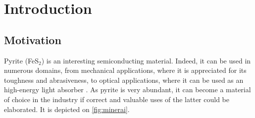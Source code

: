 \documentclass[11pt,a4paper]{article}
\makeatletter
\newcommand{\authors}{%
  \setlength\arrayrulewidth{2pt}
  \begin{tabular}{l|l}
  \@authorsi
}
\newcommand\@authorsi{\@ifnextchar\stopauthors{\@authorsend}{\@authorsii}}
\newcommand\@authorsii[2]{%
  \\
  \textbf{\Large #1} &  \textbf{\Large #2}
  \\
  \@authorsi %
}
\newcommand\@authorsend[1]{
  \end{tabular}}
\def \classSigle{LMAPR2451}
\def \className{Atomistic and nanoscopic simulations}
\def \workName{Study of FeS$_\text{2}$ and its optical properties}
\def \professors{Professors Jean-Christophe Charlier, Xavier Gonze \& Gian-Marco Rignanese\\Mentors : Alexandre Cloots \& Ionel-Bogdan Guster}
\def \academicYear{2020-2021}
\def \abstractText{This report aims to investigate the optical properties of FeS$_\text{2}$. To do so, \textit{ab initio} computations are first performed on a 6-atoms orthorhombic unit cell. The convergence with respect to several structural parameters is also studied. The optical properties are then analyzed in the light of the obtained results. Finally, a comparison is made with the published research, and a discussion about the quality of the simulation is made.}
\makeatother
\begin{document}
\tableofcontents
\newpage
\section{Introduction}
\subsection{Motivation}
Pyrite (FeS$_2$) is an interesting semiconducting material. Indeed, it can be used in numerous domains, from mechanical applications, where it is appreciated for its toughness and abrasiveness, to optical applications, where it can be used as an high-energy light absorber \cite{pyriteApps}. As pyrite is very abundant, it can become a material of choice in the industry if correct and valuable uses of the latter could be elaborated. It is depicted on \autoref{fig:minerai}.
\end{document}
